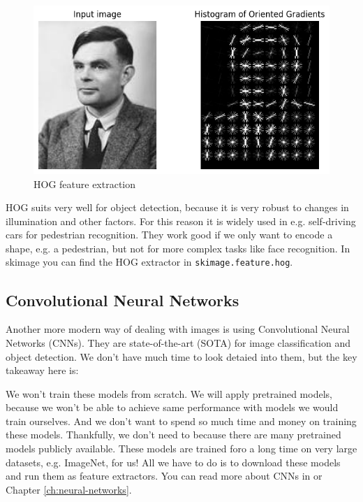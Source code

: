 \begin{figure}[h]
  \centering
  \includegraphics[width=.95\textwidth]{images/hog.png}
  \caption{HOG feature extraction}
  \label{fig:hog}
\end{figure}

HOG suits very well for object detection, because it is very robust to changes in illumination and other factors.
For this reason it is widely used in e.g. self-driving cars for pedestrian recognition.
They work good if we only want to encode a shape, e.g. a pedestrian, but not for more complex tasks like face recognition.
In skimage you can find the HOG extractor in \lstinline{skimage.feature.hog}.

\subsection{Convolutional Neural Networks}
Another more modern way of dealing with images is using Convolutional Neural Networks (CNNs).
They are state-of-the-art (SOTA) for image classification and object detection.
We don't have much time to look detaied into them, but the key takeaway here is:

We won't train these models from scratch. We will apply pretrained models, because we won't
be able to achieve same performance with models we would train ourselves.
And we don't want to spend so much time and money on training these models.
Thankfully, we don't need to because there are many pretrained models publicly available.
These models are trained foro a long time on very large datasets, e.g. ImageNet\cite{deng2009imagenet}, for us!
All we have to do is to download these models and run them as feature extractors.
You can read more about CNNs in \cite{PhilippZettl:2022} or Chapter \ref{ch:neural-networks}.


